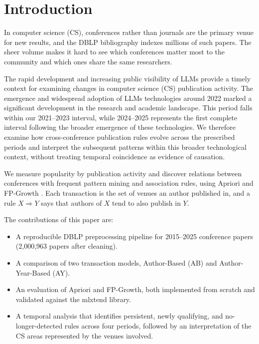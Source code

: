 ﻿\documentclass[conference]{IEEEtran}
\begin{document}
\section{Introduction}
In computer science (CS), conferences rather than journals are the primary venue for new results, and the DBLP bibliography \cite{dblp} indexes millions of such papers. The sheer volume makes it hard to see which conferences matter most to the community and which ones share the same researchers.

The rapid development and increasing public visibility of LLMs provide a timely context for examining changes in computer science (CS) publication activity. The emergence and widespread adoption of LLMs technologies around 2022 marked a significant development in the research and academic landscape. This period falls within our 2021–2023 interval, while 2024–2025 represents the first complete interval following the broader emergence of these technologies. We therefore examine how cross-conference publication rules evolve across the prescribed periods and interpret the subsequent patterns within this broader technological context, without treating temporal coincidence as evidence of causation.

We measure popularity by publication activity and discover relations between conferences with frequent pattern mining and association rules, using Apriori \cite{apriori} and FP-Growth \cite{fpgrowth}. Each transaction is the set of venues an author published in, and a rule $X \Rightarrow Y$ says that authors of $X$ tend to also publish in $Y$.

The contributions of this paper are:
\begin{itemize}
\item A reproducible DBLP preprocessing pipeline for 2015--2025 conference papers (2,000,963 papers after cleaning).
\item A comparison of two transaction models, Author-Based (AB) and Author-Year-Based (AY).
\item An evaluation of Apriori and FP-Growth, both implemented from scratch and validated against the mlxtend library.
\item A temporal analysis that identifies persistent, newly qualifying, and no-longer-detected rules across four periods, followed by an interpretation of the CS areas represented by the venues involved.
\end{itemize}
\end{document}
